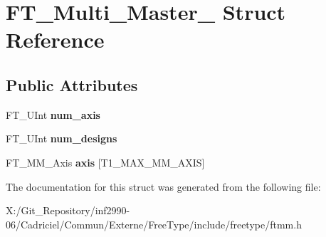 \hypertarget{struct_f_t___multi___master__}{\section{F\-T\-\_\-\-Multi\-\_\-\-Master\-\_\- Struct Reference}
\label{struct_f_t___multi___master__}
}
\subsection*{Public Attributes}
\begin{DoxyCompactItemize}
\item 
\hypertarget{struct_f_t___multi___master___a90a0ace4e40b91912259ad52fc86fb6f}{F\-T\-\_\-\-U\-Int {\bfseries num\-\_\-axis}}\label{struct_f_t___multi___master___a90a0ace4e40b91912259ad52fc86fb6f}

\item 
\hypertarget{struct_f_t___multi___master___a78b797ee560f4b00795a7dce9656178d}{F\-T\-\_\-\-U\-Int {\bfseries num\-\_\-designs}}\label{struct_f_t___multi___master___a78b797ee560f4b00795a7dce9656178d}

\item 
\hypertarget{struct_f_t___multi___master___a1eb062ff3b5ac245ab9421a46b349818}{F\-T\-\_\-\-M\-M\-\_\-\-Axis {\bfseries axis} \mbox{[}T1\-\_\-\-M\-A\-X\-\_\-\-M\-M\-\_\-\-A\-X\-I\-S\mbox{]}}\label{struct_f_t___multi___master___a1eb062ff3b5ac245ab9421a46b349818}

\end{DoxyCompactItemize}


The documentation for this struct was generated from the following file\-:\begin{DoxyCompactItemize}
\item 
X\-:/\-Git\-\_\-\-Repository/inf2990-\/06/\-Cadriciel/\-Commun/\-Externe/\-Free\-Type/include/freetype/ftmm.\-h\end{DoxyCompactItemize}
